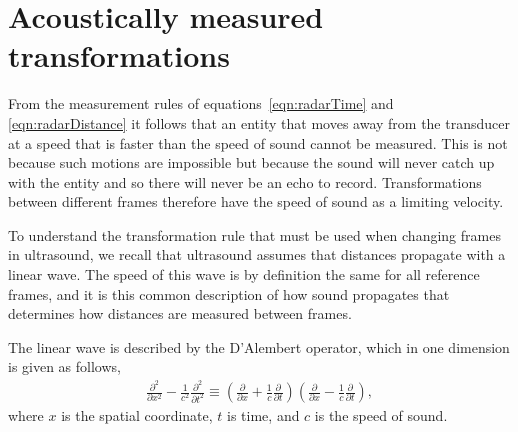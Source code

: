 

\section{Acoustically measured transformations}




From the measurement rules of equations~\ref{eqn:radarTime} and \ref{eqn:radarDistance}
it follows that an entity that moves away from the transducer at a speed that is faster than the speed of sound cannot be measured.  
This is not because such motions are impossible but because the sound will never catch  up with the entity and so there will never be an echo to record.
Transformations between different frames therefore have the speed of sound as a limiting velocity.


To understand the transformation rule that must be used when changing frames in ultrasound,
we  recall that ultrasound assumes that distances propagate with a linear wave.
The speed of this wave is by definition the same for all reference frames,
and it is this common description of how sound propagates that determines how distances are measured between frames. 


The linear wave is described by the D'Alembert operator, which in one dimension is given as follows,
\begin{align}
  \frac{\partial^2 }{\partial x^2} - \frac{1}{c^2}\frac{\partial^2 }{\partial t^2} \equiv
  \left(\frac{\partial }{\partial x}  + \frac{1}{c}\frac{\partial }{\partial t}\right)
  \left(\frac{\partial }{\partial x}  - \frac{1}{c}\frac{\partial }{\partial t}\right),
\end{align}
where $x$ is the spatial coordinate, $t$ is time, and $c$ is the speed of sound.

